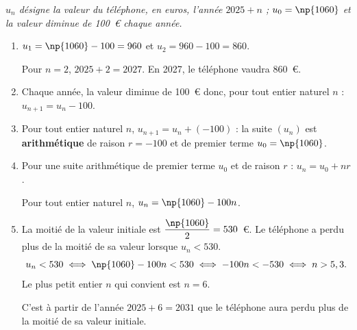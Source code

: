 \emph{$u_n$ désigne la valeur du téléphone, en euros, l'année $2025 + n$ ; $u_0 = \np{1060}$ et la
valeur diminue de 100~\euro{} chaque année.}

\begin{enumerate}
	\item $u_1 = \np{1060} - 100 = 960$ \quad et \quad $u_2 = 960 - 100 = 860$.

	Pour $n = 2$,\: $2025 + 2 = 2027$.
	En 2027, le téléphone vaudra 860~\euro.

	\item Chaque année, la valeur diminue de 100~\euro{} donc, pour tout entier naturel $n$ :
	$u_{n+1} = u_n - 100$.

	\item Pour tout entier naturel $n$, $u_{n+1} = u_n + (-100)$ : la suite $(u_n)$ est
	\textbf{arithmétique} de raison $r = -100$ et de premier terme $u_0 = \np{1060}$.

	\item Pour une suite arithmétique de premier terme $u_0$ et de raison $r$ :
	$u_n = u_0 + nr$.

	Pour tout entier naturel $n$, $u_n = \np{1060} - 100n$.

	\item La moitié de la valeur initiale est $\dfrac{\np{1060}}{2} = 530$~\euro. Le téléphone a perdu plus
	de la moitié de sa valeur lorsque $u_n < 530$.
	\[u_n < 530 \iff \np{1060} - 100n < 530 \iff -100n < -530 \iff n > 5,3.\]
	Le plus petit entier $n$ qui convient est $n = 6$.

	C'est à partir de l'année $2025 + 6 = 2031$ que le téléphone aura perdu plus de
	la moitié de sa valeur initiale.
\end{enumerate}
